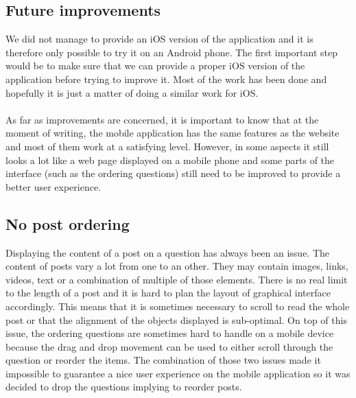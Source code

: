 \subsection{Future improvements}
We did not manage to provide an iOS version of the application and it is therefore only possible to try it on an Android phone. The first important step would be to make sure that we can provide a proper iOS version of the application before trying to improve it. Most of the work has been done and hopefully it is just a matter of doing a similar work for iOS.\\\\
As far as improvements are concerned, it is important to know that at the moment of writing, the mobile application has the same features as the website and most of them work at a satisfying level. However, in some aspects it still looks a lot like a web page displayed on a mobile phone and some parts of the interface (such as the ordering questions) still need to be improved to provide a better user experience.


\subsection{No post ordering}\label{subsec:postorder}
Displaying the content of a post on a question has always been an issue. The content of posts vary a lot from one to an other. They may contain images, links, videos, text or a combination of multiple of those elements. There is no real limit to the length of a post and it is hard to plan the layout of graphical interface accordingly. This means that it is sometimes necessary to scroll to read the whole post or that the alignment of the objects displayed is sub-optimal. On top of this issue, the ordering questions are sometimes hard to handle on a mobile device because the drag and drop movement can be used to either scroll through the question or reorder the items. The combination of those two issues made it impossible to guarantee a nice user experience on the mobile application so it was decided to drop the questions implying to reorder posts.
